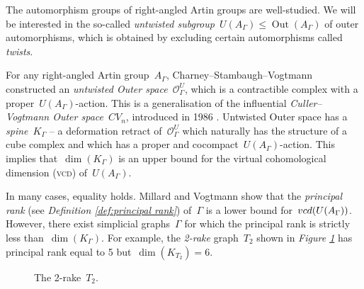 \documentclass[11pt]{amsart}
\theoremstyle{definition}
\theoremstyle{definition}
\theoremstyle{definition}
\theoremstyle{definition}
\newcommand{\raag}{A_\Gamma} %
\newcommand{\uag}{U(A_{\Gamma})} %
\newcommand{\oag}{\operatorname{Out}(A_{\Gamma})} %
\newcommand{\vcduag}{\textsc{vcd}(U(A_{\Gamma}))} %
\newcommand{\spine}{K_{\Gamma}} %
\begin{document}
The automorphism groups of right-angled Artin groups are well-studied. We will be interested in the so-called \emph{untwisted subgroup}~$U(A_\Gamma) \leq \oag$ of outer automorphisms, which is obtained by excluding certain automorphisms called \emph{twists}. 

For any right-angled Artin group~$\raag$, Charney--Stambaugh--Vogtmann \cite{CharneyStambaughVogtmannUntwistedOuterSpace17} constructed an \emph{untwisted Outer space}~$\mathcal{O}_\Gamma^U$, which is a contractible complex with a proper~$\uag$-action. This is a generalisation of the influential \emph{Culler--Vogtmann Outer space}~$CV_n$, introduced in 1986 \cite{CullerVogtmannOuterSpace86}. Untwisted Outer space has a \emph{spine}~$\spine$ -- a deformation retract  of~$\mathcal{O}_\Gamma^U$ which naturally has the structure of a cube complex and which has a proper and cocompact~$\uag$-action. This implies that~$\dim\left(\spine\right)$ is an upper bound for the virtual cohomological dimension (\textsc{vcd}) of~$\uag$.

In many cases, equality holds. Millard and Vogtmann \cite{MillardVogtmannCubeComplexes21} show that the \emph{principal rank} (see \textit{Definition \ref{def:principal rank}}) of~$\Gamma$ is a lower bound for~$\vcduag$. However, there exist simplicial graphs~$\Gamma$ for which the principal rank is strictly less than~$\dim(\spine)$. For example, the \emph{2-rake} graph~$T_2$ shown in \textit{Figure \ref{fig:2-rake (intro)}} has principal rank equal to 5 but~$\dim(K_{T_2}) = 6$.

\begin{figure}[H]
    \begin{center}
        \caption{The 2-rake~$T_2$.}
        \label{fig:2-rake (intro)}
    \end{center}
\end{figure}
\end{document}
